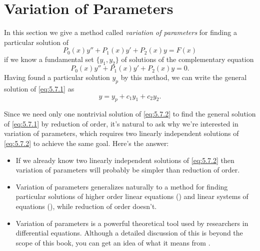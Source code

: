 \section{Variation of Parameters}\label{sec:variation_param}

In this section we give a method called
\emph{\color{blue}variation of parameters}
for finding a particular
solution
of
\begin{equation} \label{eq:5.7.1}
P_0(x)y''+P_1(x)y'+P_2(x)y=F(x)
\end{equation}
if we know a fundamental set $\{y_1,y_2\}$ of solutions of  the
complementary equation
\begin{equation} \label{eq:5.7.2}
P_0(x)y''+P_1(x)y'+P_2(x)y=0.
\end{equation}
Having found a particular solution $y_p$ by this method, we can write
the general solution of \eqref{eq:5.7.1} as
\[
y=y_p+c_1y_1+c_2y_2.
\]

Since we need only one nontrivial solution of \eqref{eq:5.7.2} to find the
general solution of \eqref{eq:5.7.1} by reduction of order, it's natural
to ask why we're interested in variation of parameters, which requires
two linearly independent solutions of \eqref{eq:5.7.2} to achieve the same
goal. Here's the answer:

\begin{itemize}
\item If we already know two linearly independent solutions of
\eqref{eq:5.7.2} then  variation of parameters will probably  be simpler
than reduction of order.

\item Variation of parameters generalizes naturally to a method
for finding particular solutions of higher order
linear equations () and  linear systems of
equations
(), while reduction of order doesn't.

\item Variation of parameters is a powerful theoretical tool
 used by researchers in differential equations. Although a detailed
discussion of this is beyond the scope of this book, you can get an
idea of what it means from .
 \end{itemize}

